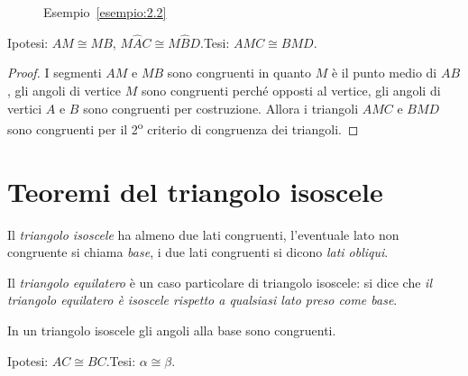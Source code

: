 \begin{exrig}
\begin{esempio}
\begin{inaccessibleblock}
 \begin{figure}[htb]
\centering
\caption{Esempio~\ref{esempio:2.2}}\label{fig:esempio2.2}
\end{figure}
\end{inaccessibleblock}

\noindent Ipotesi: $AM\cong MB$, $M\widehat{A}C\cong 
M\widehat{B}D$.\tab Tesi: $AMC\cong BMD$.

\begin{proof}
I segmenti $AM$ e $MB$ sono congruenti in quanto $M$ è il punto medio 
di $AB$, gli angoli di vertice $M$ sono congruenti perché opposti al 
vertice, gli angoli di vertici $A$ e $B$ sono congruenti per 
costruzione. Allora i triangoli $AMC$ e $BMD$ sono congruenti per il 
2\textsuperscript{o} criterio di congruenza dei triangoli.
\end{proof}
\end{esempio}
\end{exrig}

\section{Teoremi del triangolo 
isoscele}\label{sect:teoremi_triangolo_isoscele}

Il \emph{triangolo isoscele} ha almeno due lati congruenti, 
l'eventuale lato non congruente si chiama \emph{base}, i due lati 
congruenti si dicono \emph{lati obliqui}.

Il \emph{triangolo equilatero} è un caso particolare di triangolo 
isoscele: si dice che \emph{il triangolo equilatero è isoscele 
rispetto a qualsiasi lato preso come base}.

\begin{teorema}
In un triangolo isoscele gli angoli alla base sono congruenti.
\end{teorema}


\begin{inaccessibleblock}
 \begin{figure}[htb]
\centering
\end{figure}
\end{inaccessibleblock}

\noindent Ipotesi: $AC\cong BC$.\tab Tesi: $\alpha\cong \beta$.

